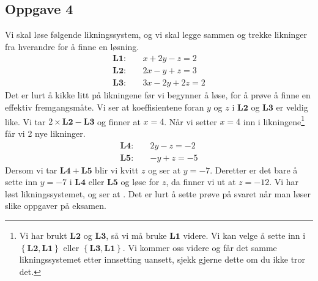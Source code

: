 \subsection*{Oppgave 4}
Vi skal løse følgende likningssystem, og vi skal legge sammen og trekke likninger fra hverandre for å finne en løsning.
\begin{align*}
	\mathbf{L1: }\quad &x + 2y - z = 2\\
	\mathbf{L2: }\quad &2x - y + z = 3 \\
	\mathbf{L3: }\quad &3x - 2y + 2z = 2
\end{align*}
Det er lurt å kikke litt på likningene før vi begynner å løse, for å prøve å finne en effektiv fremgangsmåte.
Vi ser at koeffisientene foran $y$ og $z$ i $\mathbf{L2}$ og $\mathbf{L3}$ er veldig like.
Vi tar $2 \times \mathbf{L2} - \mathbf{L3}$ og finner at $x = 4$. 
Når vi setter $x = 4$ inn i likningene\footnote{Vi har brukt $\mathbf{L2}$ og $\mathbf{L3}$, så vi må bruke $\mathbf{L1}$ videre. Vi kan velge å sette inn i  $\left\{\mathbf{L2}, \mathbf{L1}\right\}$ eller $\left\{\mathbf{L3}, \mathbf{L1}\right\}$. Vi kommer oss videre og får det samme likningssystemet etter innsetting uansett, sjekk gjerne dette om du ikke tror det.} får vi 2 nye likninger.
\begin{align*}
\mathbf{L4: }\quad &2y - z = -2\\
\mathbf{L5: }\quad &- y + z = -5
\end{align*}
Dersom vi tar $\mathbf{L4} + \mathbf{L5}$ blir vi kvitt $z$ og ser at $y = -7$.
Deretter er det bare å sette inn $y = -7$ i $\mathbf{L4}$ eller $\mathbf{L5}$ og løse for $z$,
da finner vi ut at $z = -12$. Vi har løst likningssystemet, og ser at . Det er lurt å sette prøve på svaret når man løser slike oppgaver på eksamen.

